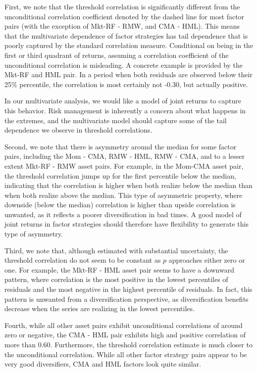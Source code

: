 First, we note that the threshold correlation is significantly different from the unconditional correlation coefficient denoted by the dashed line for most factor pairs (with the exception of Mkt-RF - RMW, and CMA - HML). This means that the multivariate dependence of factor strategies has tail dependence that is poorly captured by the standard correlation measure. Conditional on being in the first or third quadrant of returns, assuming a correlation coefficient of the unconditional correlation is misleading. A concrete example is provided by the Mkt-RF and HML pair. In a period when both residuals are observed below their 25\% percentile, the correlation is most certainly not -0.30, but actually positive.

In our multivariate analysis, we would like a model of joint returns to capture this behavior. Risk management is inherently a concern about what happens in the extremes, and the multivariate model should capture some of the tail dependence we observe in threshold correlations.

Second, we note that there is asymmetry around the median for some factor pairs, including the Mom - CMA, RMW - HML, RMW - CMA, and to a lesser extent Mkt-RF - RMW asset pairs. For example, in the Mom-CMA asset pair, the threshold correlation jumps up for the first percentile below the median, indicating that the correlation is higher when both realize below the median than when both realize above the median. This type of asymmetric property, where downside (below the median) correlation is higher than upside correlation is unwanted, as it reflects a poorer diversification in bad times. A good model of joint returns in factor strategies should therefore have flexibility to generate this type of asymmetry.

Third, we note that, although estimated with substantial uncertainty, the threshold correlation do not seem to be constant as $p$ approaches either zero or one. For example, the Mkt-RF - HML asset pair seems to have a downward pattern, where correlation is the most positive in the lowest percentiles of residuals and the most negative in the highest percentile of residuals. In fact, this pattern is unwanted from a diversification perspective, as diversification benefits decrease when the series are realizing in the lowest percentiles.

Fourth, while all other asset pairs exhibit unconditional correlations of around zero or negative, the CMA - HML pair exhibits high and positive correlation of more than 0.60. Furthermore, the threshold correlation estimate is much closer to the unconditional correlation. While all other factor strategy pairs appear to be very good diversifiers, CMA and HML factors look quite similar.

